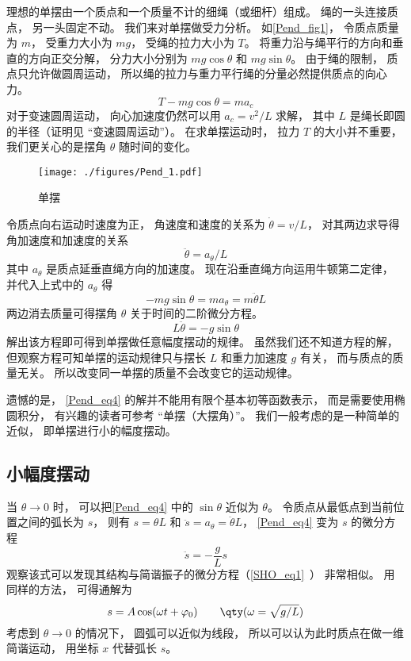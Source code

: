 

理想的单摆由一个质点和一个质量不计的细绳（或细杆）组成。 绳的一头连接质点， 另一头固定不动。 我们来对单摆做受力分析。 如\autoref{Pend_fig1}， 令质点质量为 $m$， 受重力大小为 $mg$， 受绳的拉力大小为 $T$。 将重力沿与绳平行的方向和垂直的方向正交分解， 分力大小分别为 $mg\cos\theta$ 和 $mg\sin\theta$。 由于绳的限制， 质点只允许做圆周运动， 所以绳的拉力与重力平行绳的分量必然提供质点的向心力。
\begin{equation}
T - mg\cos\theta = ma_c
\end{equation}
对于变速圆周运动， 向心加速度仍然可以用 $a_c = v^2/L$ 求解， 其中 $L$ 是绳长即圆的半径（证明见 “变速圆周运动”）。%
在求单摆运动时， 拉力 $T$ 的大小并不重要， 我们更关心的是摆角 $\theta$ 随时间的变化。
\begin{figure}[ht]
\centering
\texttt{[image: ./figures/Pend\_1.pdf]}
\caption{单摆} \label{Pend_fig1}
\end{figure}

令质点向右运动时速度为正， 角速度和速度的关系为 $\dot\theta = v/L$， 对其两边求导得角加速度和加速度的关系
\begin{equation}
\ddot\theta = a_\theta/L
\end{equation}
其中 $a_\theta$ 是质点延垂直绳方向的加速度。 现在沿垂直绳方向运用牛顿第二定律， 并代入上式中的 $a_\theta$ 得
\begin{equation}
-mg\sin\theta = ma_\theta = m\ddot\theta L
\end{equation}
两边消去质量可得摆角 $\theta$ 关于时间的二阶微分方程。
\begin{equation}\label{Pend_eq4}
L\ddot\theta = - g\sin\theta
\end{equation}
解出该方程即可得到单摆做任意幅度摆动的规律。 虽然我们还不知道方程的解， 但观察方程可知单摆的运动规律只与摆长 $L$ 和重力加速度 $g$ 有关， 而与质点的质量无关。 所以改变同一单摆的质量不会改变它的运动规律。

遗憾的是， \autoref{Pend_eq4} 的解并不能用有限个基本初等函数表示， 而是需要使用椭圆积分， 有兴趣的读者可参考 “单摆（大摆角）”。 我们一般考虑的是一种简单的近似， 即单摆进行小的幅度摆动。

\subsection{小幅度摆动}
当 $\theta \to 0$ 时， 可以把\autoref{Pend_eq4} 中的 $\sin\theta$ 近似为 $\theta$。 令质点从最低点到当前位置之间的弧长为 $s$， 则有 $s = \theta L$ 和 $\ddot s = a_\theta = \ddot\theta L$， \autoref{Pend_eq4} 变为 $s$ 的微分方程
\begin{equation}
\ddot s = - \frac gL s
\end{equation}
观察该式可以发现其结构与简谐振子的微分方程（\autoref{SHO_eq1}~） 非常相似。 用同样的方法， 可得通解为
\begin{equation}
s = A\cos(\omega t + \varphi_0)  \qquad \qty(\omega  = \sqrt{g/L})
\end{equation}
考虑到 $\theta \to 0$ 的情况下， 圆弧可以近似为线段， 所以可以认为此时质点在做一维简谐运动， 用坐标 $x$ 代替弧长 $s$。
